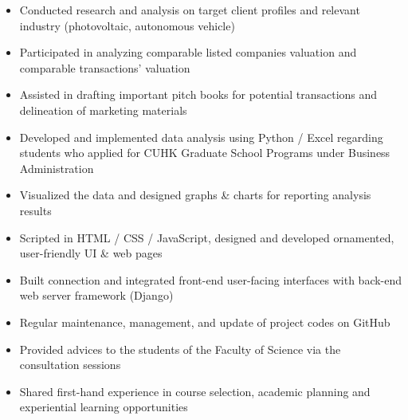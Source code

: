 \documentclass[10pt]{article}
\begin{document}
    \begin{itemize}
        \item Conducted research and analysis on target client profiles and relevant industry (photovoltaic, autonomous vehicle)
        \item Participated in analyzing comparable listed companies valuation and comparable transactions' valuation
        \item Assisted in drafting important pitch books for potential transactions and delineation of marketing materials
    \end{itemize}
    \begin{itemize}
        \item Developed and implemented data analysis using Python / Excel regarding students who applied for CUHK Graduate School Programs under Business Administration
        \item Visualized the data and designed graphs \& charts for reporting analysis results
    \end{itemize}
    \begin{itemize}
        \item Scripted in HTML / CSS / JavaScript, designed and developed ornamented, user-friendly UI \& web pages
        \item Built connection and integrated front-end user-facing interfaces with back-end web server framework (Django)
        \item Regular maintenance, management, and update of project codes on GitHub
    \end{itemize}
    \begin{itemize}
        \item Provided advices to the students of the Faculty of Science via the consultation sessions
        \item Shared first-hand experience in course selection, academic planning and experiential learning opportunities
    \end{itemize}
    
\end{document}
